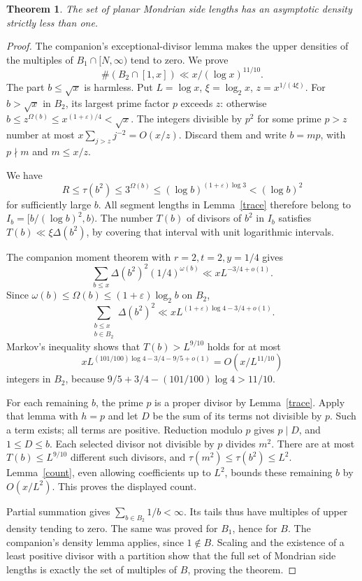 \documentclass[11pt,a4paper]{article}
\newtheorem{theorem}{Theorem}
\newcommand{\Del}{\Delta}
\newcommand{\om}{\omega}
\newcommand{\Om}{\Omega}
\begin{document}
\begin{theorem}\label{planar}
The set of planar Mondrian side lengths has an asymptotic density
strictly less than one.
\end{theorem}
\begin{proof}
The companion's exceptional-divisor lemma makes the upper densities of
the multiples of $B_1\cap[N,\infty)$ tend to zero. We prove
\[
 \#(B_2\cap[1,x])\ll x/(\log x)^{11/10}.
\]
The part $b\le\sqrt x$ is harmless. Put $L=\log x$, $\xi=\log_2x$,
$z=x^{1/(4\xi)}$. For $b>\sqrt x$ in $B_2$, its largest prime factor
$p$ exceeds $z$: otherwise
$b\le z^{\Om(b)}\le x^{(1+\varepsilon)/4}<\sqrt x$.
The integers divisible by $p^2$ for some prime $p>z$ number at most
$x\sum_{j>z}j^{-2}=O(x/z)$. Discard them and write $b=mp$, with
$p\nmid m$ and $m\le x/z$.

We have
\[
 R\le\tau(b^2)\le3^{\Om(b)}
 \le(\log b)^{(1+\varepsilon)\log3}< (\log b)^2
\]
for sufficiently large $b$. All segment lengths in Lemma~\ref{trace}
therefore belong to
$I_b=[b/(\log b)^2,b)$.
The number $T(b)$ of divisors of $b^2$ in $I_b$ satisfies
$T(b)\ll\xi\Del(b^2)$, by covering that interval with unit
logarithmic intervals.

The companion moment theorem with $r=2,t=2,y=1/4$ gives
\[
 \sum_{b\le x}\Del(b^2)^2(1/4)^{\om(b)}
 \ll xL^{-3/4+o(1)}.
\]
Since $\om(b)\le\Om(b)\le(1+\varepsilon)\log_2b$ on $B_2$,
\[
 \sum_{\substack{b\le x\\b\in B_2}}\Del(b^2)^2
 \ll xL^{(1+\varepsilon)\log4-3/4+o(1)}.
\]
Markov's inequality shows that $T(b)>L^{9/10}$ holds for at most
\[
 xL^{(101/100)\log4-3/4-9/5+o(1)}
 =O(x/L^{11/10})
\]
integers in $B_2$, because
$9/5+3/4-(101/100)\log4>11/10$.

For each remaining $b$, the prime $p$ is a proper divisor by
Lemma~\ref{trace}. Apply that lemma with $h=p$ and let $D$ be the sum
of its terms not divisible by $p$. Such a term exists; all terms are
positive. Reduction modulo $p$ gives $p\mid D$, and $1\le D\le b$.
Each selected divisor not divisible by $p$ divides $m^2$. There are at
most $T(b)\le L^{9/10}$ different such divisors, and
$\tau(m^2)\le\tau(b^2)\le L^2$. Lemma~\ref{count}, even allowing
coefficients up to $L^2$, bounds these remaining $b$ by $O(x/L^2)$.
This proves the displayed count.

Partial summation gives $\sum_{b\in B_2}1/b<\infty$. Its tails thus
have multiples of upper density tending to zero. The same was proved
for $B_1$, hence for $B$. The companion's density lemma applies, since
$1\notin B$. Scaling and the existence of a least positive divisor
with a partition show that the full set of Mondrian side lengths is
exactly the set of multiples of $B$, proving the theorem.
\end{proof}
\end{document}
